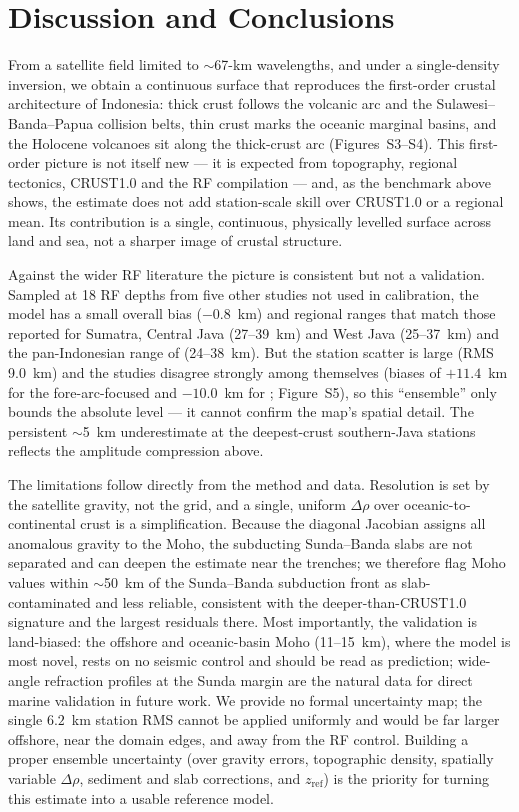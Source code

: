 \documentclass{agujournal2019}
\begin{document}
\section{Discussion and Conclusions}
From a satellite field limited to $\sim$67-km wavelengths, and under a single-density
inversion, we obtain a continuous surface that reproduces the first-order crustal
architecture of Indonesia: thick crust
follows the volcanic arc and the Sulawesi--Banda--Papua collision belts, thin crust
marks the oceanic marginal basins, and the Holocene volcanoes sit along the
thick-crust arc (Figures~S3--S4). This first-order picture is not itself new --- it
is expected from topography, regional tectonics, CRUST1.0 and the RF compilation ---
and, as the benchmark above shows, the estimate does not add station-scale skill
over CRUST1.0 or a regional mean. Its contribution is a single, continuous,
physically levelled surface across land and sea, not a sharper image of crustal
structure.

Against the wider RF literature the picture is consistent but not a validation.
Sampled at 18 RF depths from five other studies
\cite{kieling2011,macpherson2012,bora2016,syuhada2016,anggono2020} not used in
calibration, the model has a small overall bias ($-0.8$~km) and regional ranges that
match those reported for Sumatra, Central Java (27--39~km) and West Java (25--37~km)
and the pan-Indonesian range of \citet{zhang2023} (24--38~km). But the station
scatter is large (RMS 9.0~km) and the studies disagree strongly among themselves
(biases of $+11.4$~km for the fore-arc-focused \citealt{macpherson2012} and
$-10.0$~km for \citealt{syuhada2016}; Figure~S5), so this ``ensemble'' only bounds
the absolute level --- it cannot confirm the map's spatial detail. The persistent
$\sim$5~km underestimate at the deepest-crust southern-Java stations reflects the
amplitude compression above.

The limitations follow directly from the method and data. Resolution is set by the
satellite gravity, not the grid, and a single, uniform $\Delta\rho$ over
oceanic-to-continental crust is a simplification. Because the diagonal Jacobian
assigns all anomalous gravity to the Moho, the subducting Sunda--Banda slabs are not
separated and can deepen the estimate near the trenches; we therefore flag Moho
values within $\sim$50~km of the Sunda--Banda subduction front as slab-contaminated
and less reliable, consistent with the deeper-than-CRUST1.0 signature and the largest
residuals there. Most importantly, the validation is land-biased: the offshore and
oceanic-basin Moho (11--15~km), where the model is most novel, rests on no seismic
control and should be read as prediction; wide-angle refraction profiles at the Sunda
margin \citep{planert2010} are the natural data for direct marine validation in
future work. We provide no formal uncertainty map; the single $6.2$~km station RMS
cannot be applied uniformly and would be far larger offshore, near the domain edges,
and away from the RF control. Building a proper ensemble uncertainty (over gravity
errors, topographic density, spatially variable $\Delta\rho$, sediment and slab
corrections, and $z_{\mathrm{ref}}$) is the priority for turning this estimate into a
usable reference model.
\end{document}
